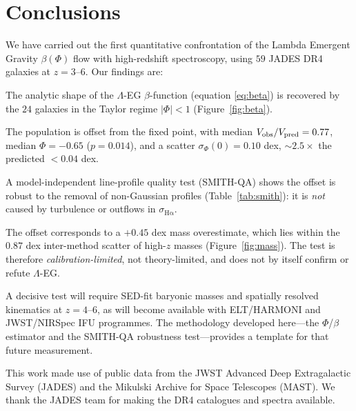 \documentclass{rmxaa}
\newcommand{\Vobs}{V_{\rm obs}}
\newcommand{\Vpred}{V_{\rm pred}}
\newcommand{\Ha}{\ensuremath{\mathrm{H\alpha}}}
\newcommand{\LEG}{\mbox{$\Lambda$-EG}}
\begin{document}
\section{Conclusions}
\label{sec:conclusions}

We have carried out the first quantitative confrontation of the
Lambda Emergent Gravity $\beta(\Phi)$ flow with high-redshift
spectroscopy, using $59$ JADES DR4 galaxies at $z=3$--$6$. Our findings
are:

\begin{compactenum}[(1)]
\item The analytic shape of the \LEG{} $\beta$-function (equation
  \ref{eq:beta}) is recovered by the $24$ galaxies in the Taylor regime
  $|\Phi|<1$ (Figure~\ref{fig:beta}).
\item The population is offset from the fixed point, with median
  $\Vobs/\Vpred=0.77$, median $\Phi=-0.65$ ($p=0.014$), and a scatter
  $\sigma_\Phi(0)=0.10$ dex, $\sim2.5\times$ the predicted $<0.04$ dex.
\item A model-independent line-profile quality test (SMITH-QA) shows the
  offset is robust to the removal of non-Gaussian profiles
  (Table~\ref{tab:smith}): it is \emph{not} caused by turbulence or
  outflows in $\sigma_{\Ha}$.
\item The offset corresponds to a $+0.45$ dex mass overestimate, which
  lies within the $0.87$ dex inter-method scatter of high-$z$ masses
  (Figure~\ref{fig:mass}). The test is therefore
  \emph{calibration-limited}, not theory-limited, and does not by itself
  confirm or refute \LEG.
\end{compactenum}

A decisive test will require SED-fit baryonic masses and spatially
resolved kinematics at $z=4$--$6$, as will become available with
ELT/HARMONI and JWST/NIRSpec IFU programmes. The methodology developed
here---the $\Phi$/$\beta$ estimator and the SMITH-QA robustness
test---provides a template for that future measurement.

\acknowledgments
This work made use of public data from the JWST Advanced Deep
Extragalactic Survey (JADES) and the Mikulski Archive for Space
Telescopes (MAST). We thank the JADES team for making the DR4 catalogues
and spectra available.



\end{document}
